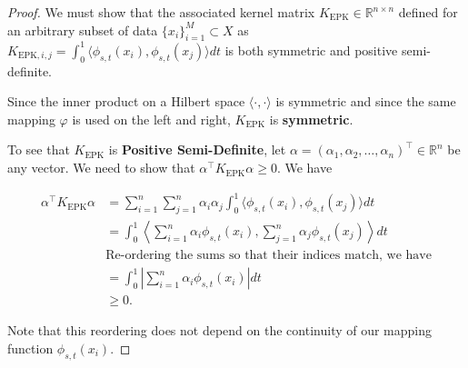\begin{proof}
We must show that the associated kernel matrix $K_{\text{EPK}} \in \mathbb{R}^{n\times n}$ defined for an arbitrary subset of data $\{x_i\}_{i=1}^M \subset X$ as $K_{\text{EPK},i,j} = \int_0^1\langle \phi_{s,t}(x_i), \phi_{s,t}(x_j)\rangle dt$ is both symmetric and positive semi-definite.

Since the inner product on a Hilbert space $\langle \cdot, \cdot \rangle$ is symmetric and since the same mapping $\varphi$ is used on the left and right, $K_{\text{EPK}}$ is \textbf{symmetric}. 

To see that $K_{\text{EPK}}$ is \textbf{Positive Semi-Definite}, let $\alpha = (\alpha_1, \alpha_2, \dots, \alpha_n)^\top \in \mathbb{R}^n$ be any vector. We need to show that $\alpha^\top K_{\text{EPK}} \alpha \geq 0$. We have

\begin{align}
\alpha^\top K_{\text{EPK}} \alpha &= \sum_{i=1}^n \sum_{j=1}^n \alpha_i \alpha_j \int_0^1 \langle \phi_{s,t}(x_i), \phi_{s,t}(x_j)\rangle dt \\
&=   \int_0^1 \left\langle \sum_{i=1}^n \alpha_i \phi_{s,t}(x_i), \sum_{j=1}^n \alpha_j \phi_{s,t}(x_j)\right\rangle dt \\
& \text{Re-ordering the sums so that their indices match, we have}\\
&=   \int_0^1 \left\lvert \sum_{i=1}^n \alpha_i \phi_{s,t}(x_i)\right\rvert dt \\
&\geq 0.
\end{align}

Note that this reordering does not depend on the continuity of our mapping function $\phi_{s,t}(x_i)$.

\end{proof}

